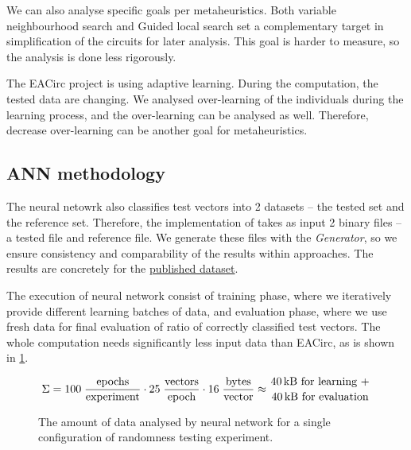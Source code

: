 \documentclass[
  print, %
  Table,   %
  nolof,     %
  nolot,     %
  11pt, %
  oneside  %
]{fithesis3}
\begin{document}
We can also analyse specific goals per metaheuristics. Both variable neighbourhood search and Guided local search set a complementary target in simplification of the circuits for later analysis. This goal is harder to measure, so the analysis is done less rigorously.

The EACirc project is using adaptive learning. During the computation, the tested data are changing. We analysed over-learning of the individuals during the learning process, and the over-learning can be analysed as well. Therefore, decrease over-learning can be another goal for metaheuristics.

\subsection{ANN methodology}
\label{subsubsec:method-spec-ms-aco}

The neural netowrk also classifies test vectors into 2 datasets -- the tested set and the reference set. Therefore, the implementation of takes as input 2 binary files -- a tested file and reference file. We generate these files with the \textit{Generator}, so we ensure consistency and comparability of the results within approaches. The results are concretely for the \href{https://drive.google.com/drive/folders/0B5Z1zst5NzwXQmFKaXgxREJWNk0?usp=sharing}{published dataset}.

The execution of neural network consist of training phase, where we iteratively provide different learning batches of data, and evaluation phase, where we use fresh data for final evaluation of ratio of correctly classified test vectors. The whole computation needs significantly less input data than EACirc, as is shown in \cref{fig:ann-dataUsage}.

\begin{figure}[t]
    \begin{equation*}
        \begin{aligned}
    \Sigma = 
             100 \;
             \frac{\textnormal{epochs}}
                  {\textnormal{experiment}}
             \cdot
             25 \;
             \frac{\textnormal{vectors}}
                  {\textnormal{epoch}}
             \cdot
             16 \;
             \frac{\textnormal{bytes}}
                  {\textnormal{vector}}
             \approx {40 \textnormal{\,kB for learning +} \atop {40 \textnormal{\,kB for evaluation}}}
        \end{aligned}
    \end{equation*}
    \caption{The amount of data analysed by neural network for a single configuration of randomness testing experiment.}
    \label{fig:ann-dataUsage}
\end{figure}
\end{document}
